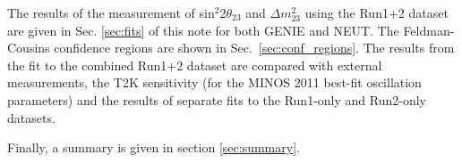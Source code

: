 The results of the measurement of sin$^{2}$2$\theta_{23}$ and $\Delta m^{2}_{23}$ 
using the Run1+2 dataset are given in Sec. \ref{sec:fits} of this note 
for both GENIE and NEUT. The Feldman-Cousins confidence regions are shown in Sec.\ \ref{sec:conf_regions}.
The results from the fit to the combined Run1+2 dataset are compared with external measurements,
the T2K sensitivity (for the MINOS 2011 best-fit oscillation parameters) 
and the results of separate fits to the Run1-only and Run2-only datasets.

Finally, a summary is given in section \ref{sec:summary}.  

